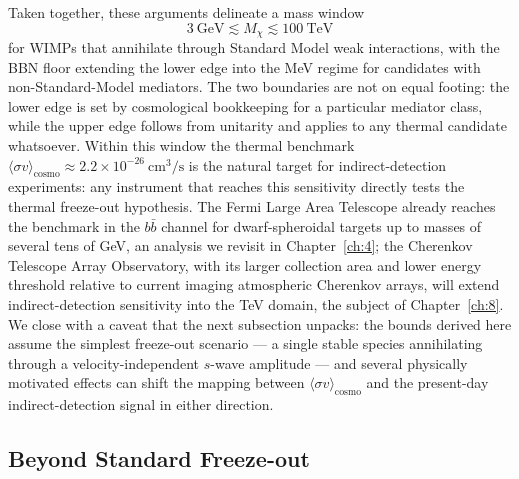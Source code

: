 Taken together, these arguments delineate a mass window
\begin{equation}
	3~\mathrm{GeV} \lesssim M_\chi \lesssim 100~\mathrm{TeV}
	\label{eq:wimp_window}
\end{equation}
for WIMPs that annihilate through Standard Model weak interactions, with the BBN floor extending the lower edge into the MeV regime for candidates with non-Standard-Model mediators.
The two boundaries are not on equal footing: the lower edge is set by cosmological bookkeeping for a particular mediator class, while the upper edge follows from unitarity and applies to any thermal candidate whatsoever.
Within this window the thermal benchmark $\langle \sigma v \rangle_\mathrm{cosmo} \approx 2.2 \times 10^{-26}~\mathrm{cm}^3/\mathrm{s}$ is the natural target for indirect-detection experiments: any instrument that reaches this sensitivity directly tests the thermal freeze-out hypothesis.
The Fermi Large Area Telescope already reaches the benchmark in the $b\bar b$ channel for dwarf-spheroidal targets up to masses of several tens of GeV, an analysis we revisit in Chapter~\ref{ch:4}; the Cherenkov Telescope Array Observatory, with its larger collection area and lower energy threshold relative to current imaging atmospheric Cherenkov arrays, will extend indirect-detection sensitivity into the TeV domain, the subject of Chapter~\ref{ch:8}.
We close with a caveat that the next subsection unpacks: the bounds derived here assume the simplest freeze-out scenario --- a single stable species annihilating through a velocity-independent $s$-wave amplitude --- and several physically motivated effects can shift the mapping between $\langle \sigma v \rangle_\mathrm{cosmo}$ and the present-day indirect-detection signal in either direction.

\subsection{Beyond Standard Freeze-out}
\label{sec:1.2.4}

